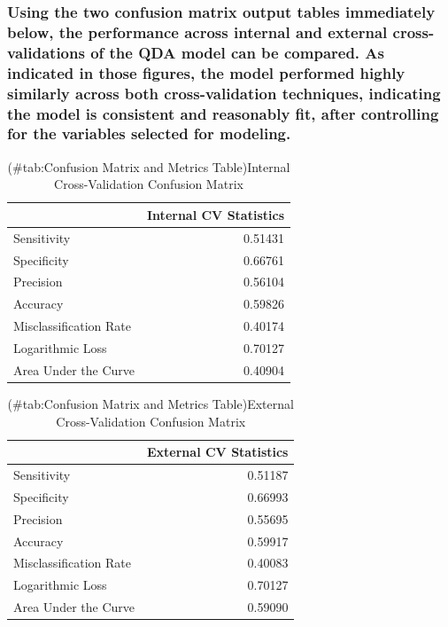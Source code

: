 \documentclass[american,]{article}
\begin{document}
\hypertarget{using-the-two-confusion-matrix-output-tables-immediately-below-the-performance-across-internal-and-external-cross-validations-of-the-qda-model-can-be-compared.-as-indicated-in-those-figures-the-model-performed-highly-similarly-across-both-cross-validation-techniques-indicating-the-model-is-consistent-and-reasonably-fit-after-controlling-for-the-variables-selected-for-modeling.}{%
\subsubsection{Using the two confusion matrix output tables immediately below, the performance across internal and external cross-validations of the QDA model can be compared. As indicated in those figures, the model performed highly similarly across both cross-validation techniques, indicating the model is consistent and reasonably fit, after controlling for the variables selected for modeling.}\label{using-the-two-confusion-matrix-output-tables-immediately-below-the-performance-across-internal-and-external-cross-validations-of-the-qda-model-can-be-compared.-as-indicated-in-those-figures-the-model-performed-highly-similarly-across-both-cross-validation-techniques-indicating-the-model-is-consistent-and-reasonably-fit-after-controlling-for-the-variables-selected-for-modeling.}}

\begin{table}[t]

\caption{(\#tab:Confusion Matrix and Metrics Table)Internal Cross-Validation Confusion Matrix}
\centering
\begin{tabular}{lr}
\toprule
  & Internal CV Statistics\\
\midrule
Sensitivity & 0.51431\\
Specificity & 0.66761\\
Precision & 0.56104\\
Accuracy & 0.59826\\
Misclassification Rate & 0.40174\\
\addlinespace
Logarithmic Loss & 0.70127\\
Area Under the Curve & 0.40904\\
\bottomrule
\end{tabular}
\end{table}

\begin{table}[t]

\caption{(\#tab:Confusion Matrix and Metrics Table)External Cross-Validation Confusion Matrix}
\centering
\begin{tabular}{lr}
\toprule
  & External CV Statistics\\
\midrule
Sensitivity & 0.51187\\
Specificity & 0.66993\\
Precision & 0.55695\\
Accuracy & 0.59917\\
Misclassification Rate & 0.40083\\
\addlinespace
Logarithmic Loss & 0.70127\\
Area Under the Curve & 0.59090\\
\bottomrule
\end{tabular}
\end{table}
\end{document}
